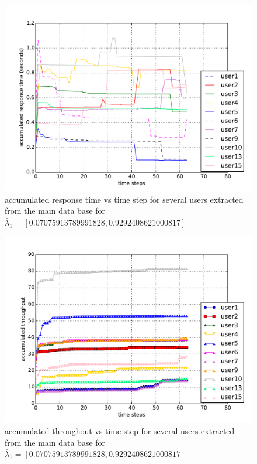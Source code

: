 \documentclass[10pt,journal,compsoc]{IEEEtran}
\begin{document}
\begin{figure}[h] %
\includegraphics[width=\linewidth]{graphs/rt_step_lambda1}
\caption{ accumulated response time vs time step for several users extracted from the main data base for  $\bar{\lambda}_1 =[0.07075913789991828, 0.9292408621000817]$}
\end{figure}

\begin{figure}[h]
\includegraphics[width=\linewidth]{graphs/trough_step_lambda1}
\caption{accumulated throughout vs time step for several users extracted from the main data base for $\bar{\lambda}_1 =[0.07075913789991828, 0.9292408621000817]$}
\end{figure}
\end{document}
